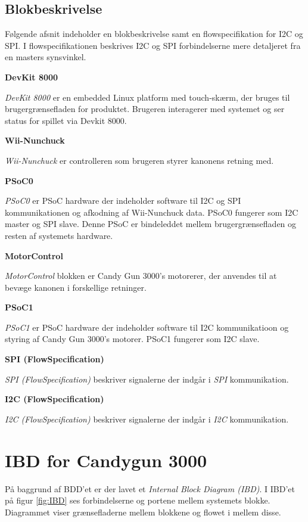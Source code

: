 \subsection{Blokbeskrivelse}
Følgende afsnit indeholder en blokbeskrivelse samt en flowspecifikation for I2C og SPI. I flowspecifikationen beskrives I2C og SPI forbindelserne mere detaljeret fra en masters synsvinkel. \newline

\noindent \textbf{DevKit 8000} \par
\noindent \textit{DevKit 8000} er en embedded Linux platform med touch-skærm, der bruges til brugergrænsefladen for produktet. Brugeren interagerer med systemet og ser status for spillet via Devkit 8000. 

\noindent \textbf{Wii-Nunchuck} \par
\noindent \textit{Wii-Nunchuck} er controlleren som brugeren styrer kanonens retning med.

\noindent \textbf{PSoC0} \par
\noindent \textit{PSoC0} er PSoC hardware der indeholder software til I2C og SPI kommunikationen og afkodning af Wii-Nunchuck data. PSoC0 fungerer som I2C master og SPI slave. Denne PSoC er bindeleddet mellem brugergrænsefladen og resten af systemets hardware.

\noindent \textbf{MotorControl} \par
\noindent \textit{MotorControl} blokken er Candy Gun 3000's motorerer, der anvendes til at bevæge kanonen i forskellige retninger.

\noindent \textbf{PSoC1} \par
\noindent \textit{PSoC1} er PSoC hardware der indeholder software til I2C kommunikatioon og styring af Candy Gun 3000's motorer. PSoC1 fungerer som I2C slave.


\noindent \textbf{SPI (FlowSpecification)} \par
\noindent \textit{SPI (FlowSpecification)} beskriver signalerne der indgår i \textit{SPI} kommunikation.

\noindent \textbf{I2C (FlowSpecification)} \par
\noindent \textit{I2C (FlowSpecification)} beskriver signalerne der indgår i \textit{I2C} kommunikation.
\section{IBD for Candygun 3000}
På baggrund af BDD'et er der lavet et \textit{Internal Block Diagram (IBD)}. I IBD'et på figur \ref{fig:IBD} ses forbindelserne og portene mellem systemets blokke. Diagrammet viser grænsefladerne mellem blokkene og flowet i mellem disse. 

